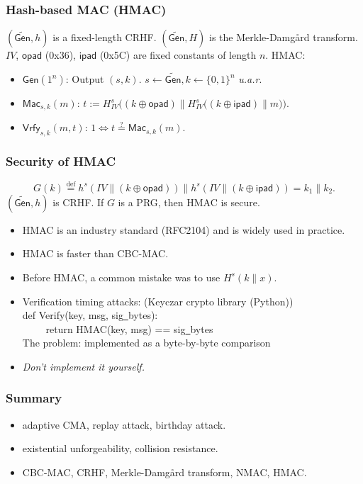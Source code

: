 \begin{frame}\frametitle{Hash-based MAC (HMAC)}
\begin{figure}
\begin{center}

\end{center}
\end{figure}
\begin{construction}
$(\widetilde{\mathsf{Gen}}, h)$ is a fixed-length CRHF. $(\widetilde{\mathsf{Gen}}, H)$ is the Merkle-Damg\r{a}rd transform.
$IV$, $\mathsf{opad}$ (0x36), $\mathsf{ipad}$ (0x5C) are fixed constants of length $n$.
HMAC:
\begin{itemize}
\item $\mathsf{Gen}(1^n)$: Output $(s, k)$. $s \gets \widetilde{\mathsf{Gen}}, k \gets \{0,1\}^n$ \emph{u.a.r}.
\item $\mathsf{Mac}_{s,k}(m)$: $t := H_{IV}^s\Big((k \oplus \mathsf{opad}) \| H_{IV}^s\big((k \oplus \mathsf{ipad}) \| m\big)\Big)$.
\item $\mathsf{Vrfy}_{s,k}(m,t)$: $1 \iff t \overset{?}{=} \mathsf{Mac}_{s,k}(m)$.
\end{itemize}
\end{construction}
\end{frame}
\begin{frame}\frametitle{Security of HMAC}
\begin{theorem}
\[ G(k) \overset{\text{def}}{=} h^s(IV\| (k\oplus \mathsf{opad})) \| 
h^s(IV\| (k\oplus \mathsf{ipad})) = k_1\| k_2.
\]
$(\widetilde{\mathsf{Gen}}, h)$ is CRHF. If $G$ is a PRG, then HMAC is secure.
\end{theorem}
\begin{itemize}
\item HMAC is an industry standard (RFC2104) and is widely used in practice.
\item HMAC is faster than CBC-MAC.
\item Before HMAC, a common mistake was to use $H^s(k\| x)$.
\item \alert{Verification timing attacks: (Keyczar crypto library (Python))} \\
def Verify(key, msg, sig\underline{\ }bytes): \\
$\qquad$ return HMAC(key, msg) == sig\underline{\ }bytes \\
The problem:  implemented as a byte-by-byte comparison
\item \alert{\emph{Don't implement it yourself.}}
\end{itemize}
\end{frame}
\begin{frame}\frametitle{Summary}
\begin{itemize}
\item adaptive CMA, replay attack, birthday attack. 
\item existential unforgeability, collision resistance.
\item CBC-MAC, CRHF, Merkle-Damg\r{a}rd transform, NMAC, HMAC. 
\end{itemize}
\end{frame}
